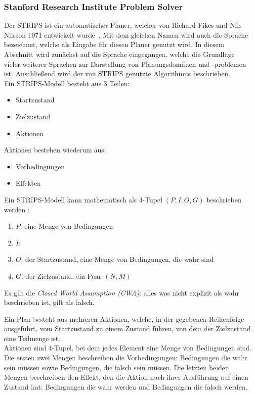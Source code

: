 \subsubsection{Stanford Research Institute Problem Solver}{\label{chap:strips}}
Der \ac{STRIPS} ist ein automatischer Planer, welcher von Richard Fikes und Nils Nilsson 1971 entwickelt wurde~\cite{FIKES1971189}.
Mit dem gleichen Namen wird auch die Sprache bezeichnet, welche als Eingabe für diesen Planer genutzt wird.
In diesem Abschnitt wird zunächst auf die Sprache eingegangen, welche die Grundlage vieler weiterer Sprachen zur Darstellung von Planungsdomänen und -problemen ist.
Anschließend wird der von \ac{STRIPS} genutzte Algorithmus beschrieben.\\
Ein \ac{STRIPS}-Modell besteht aus 3 Teilen:
\begin{itemize}
    \item Startzustand
    \item Zielzustand
    \item Aktionen
\end{itemize}
Aktionen bestehen wiederum aus:
\begin{itemize}
    \item Vorbedingungen
    \item Effekten
\end{itemize}
Ein \ac{STRIPS}-Modell kann mathematisch als 4-Tupel \((P,I,O,G)\) beschrieben werden \cite{stripsdef}:
\begin{enumerate}
    \item \(P\): eine Menge von Bedingungen
    \item \(I\):
    \item \(O\): der Startzustand, eine Menge von Bedingungen, die wahr sind
    \item \(G\): der Zielzustand, ein Paar \((N,M)\)
\end{enumerate}
Es gilt die \emph{Closed World Assumption (CWA)}: alles was nicht explizit als wahr beschrieben ist, gilt als falsch.

Ein Plan besteht aus mehreren Aktionen, welche, in der gegebenen Reihenfolge ausgeführt, vom Startzustand zu einem Zustand führen, von dem der Zielzustand eine Teilmenge ist.\\
Aktionen sind 4-Tupel, bei dem jedes Element eine Menge von Bedingungen sind.
Die ersten zwei Mengen beschreiben die Vorbedingungen: Bedingungen die wahr sein müssen sowie Bedingungen, die falsch sein müssen.
Die letzten beiden Mengen beschreiben den Effekt, den die Aktion nach ihrer Ausführung auf einen Zustand hat: Bedingungen die wahr werden und Bedingungen die falsch werden.

